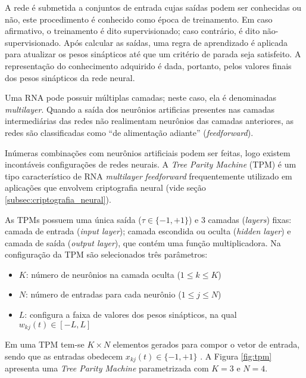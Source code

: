 \documentclass[a4paper,10pt,oneside,conference,final,keeplastbox]{inatel}
\begin{document}
            A rede é submetida a conjuntos de entrada cujas saídas podem ser conhecidas ou não, este procedimento é conhecido como época de treinamento. Em caso afirmativo, o treinamento é dito supervisionado; caso contrário, é dito não-supervisionado. Após calcular as saídas, uma regra de aprendizado é aplicada para atualizar os pesos sinápticos até que um critério de parada seja satisfeito. A representação do conhecimento adquirido é dada, portanto, pelos valores finais dos pesos sinápticos da rede neural.
            
            Uma RNA pode possuir múltiplas camadas; neste caso, ela é denominadas \textit{multilayer}. Quando a saída dos neurônios artificias presentes nas camadas intermediárias das redes não realimentam neurônios das camadas anteriores, as redes são classificadas como ``de alimentação adiante'' (\textit{feedforward}).
            
            Inúmeras combinações com neurônios artificiais podem ser feitas, logo existem incontáveis configurações de redes neurais. A \textit{Tree Parity Machine} (TPM) é um tipo característico de RNA \textit{multilayer} \textit{feedforward} frequentemente utilizado em aplicações que envolvem criptografia neural (vide seção \ref{subsec:criptografia_neural}).
            
            As TPMs possuem uma única saída ($\tau \in \{-1,+1\}$) e 3 camadas (\textit{layers}) fixas: camada de entrada (\textit{input layer}); camada escondida ou oculta (\textit{hidden layer}) e camada de saída (\textit{output layer}), que contém uma função multiplicadora. Na configuração da TPM são selecionados três parâmetros: 
            \begin{itemize}
                \item $K$: número de neurônios na camada oculta ($1 \leq k \leq K$)
                \item $N$: número de entradas para cada neurônio ($1 \leq j \leq N$)
                \item $L$: configura a faixa de valores dos pesos sinápticos, na qual $w_{kj}(t) \in [-L,L]$
            \end{itemize}
            Em uma TPM tem-se $K \times N$ elementos gerados para compor o vetor de entrada, sendo que as entradas obedecem $x_{kj}(t) \in \{-1,+1\}$ \cite{volkmer2005tree}. A Figura \ref{fig:tpm} apresenta uma \textit{Tree Parity Machine} parametrizada com $K = 3$ e $N = 4$.
            
\end{document}

